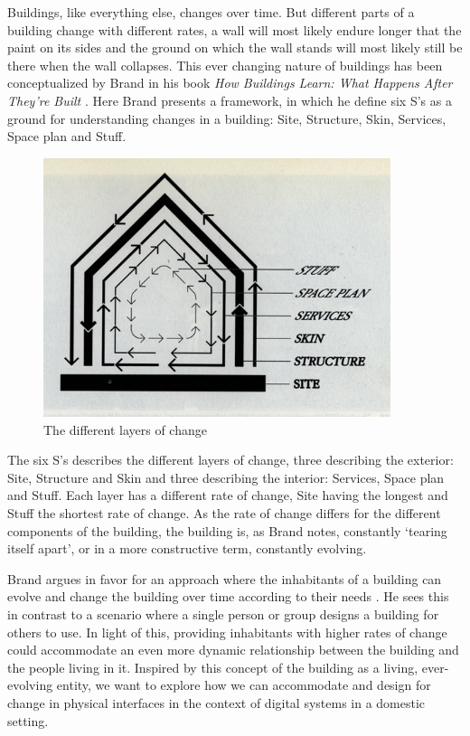 Buildings, like everything else, changes over time.
But different parts of a building change with different rates, a wall will most likely endure longer that the paint on its sides and the ground on which the wall stands will most likely still be there when the wall collapses.
This ever changing nature of buildings has been conceptualized by Brand in his book \emph{How Buildings Learn: What Happens After They're Built} \cite{brand1995buildings}.
Here Brand presents a framework, in which he define six S's as a ground for understanding changes in a building: Site, Structure, Skin, Services, Space plan and Stuff.

\begin{figure}[hb]
	\centering
  		\includegraphics[width=4in]{pictures/brand-diagram}
	\caption[The different layers of change, taken from \cite{brand1995buildings}]
   {The different layers of change \cite{brand1995buildings}}
   \label{brand-diagram}
\end{figure} 

The six S's describes the different layers of change, three describing the exterior: Site, Structure and Skin and three describing the interior: Services, Space plan and Stuff. 
Each layer has a different rate of change, Site having the longest and Stuff the shortest rate of change. As the rate of change differs for the different components of the building, the building is, as Brand notes, constantly `tearing itself apart', or in a more constructive term, constantly evolving.

Brand argues in favor for an approach where the inhabitants of a building can evolve and change the building over time according to their needs \cite{brandBBCvideo}.
He sees this in contrast to a scenario where a single person or group designs a building for others to use.
In light of this, providing inhabitants with higher rates of change could accommodate an even more dynamic relationship between the building and the people living in it.
Inspired by this concept of the building as a living, ever-evolving entity, we want to explore how we can accommodate and design for change in physical interfaces in the context of digital systems in a domestic setting.

